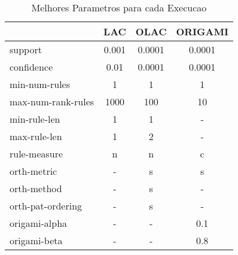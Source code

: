 \begin{table}[htbp]
	\centering
		\begin{tabular}{|l|c|c|c|}
		\hline
					& \textbf{LAC}	& \textbf{OLAC}	& \textbf{ORIGAMI}	\\
		\hline
		support			& 0.001	& 0.0001	& 0.0001		\\
		\hline
		confidence		& 0.01		& 0.0001	& 0.0001		\\
		\hline
		min-num-rules		& 1		& 1		& 1			\\
		\hline
		max-num-rank-rules	& 1000		& 100		& 10			\\
		\hline
		min-rule-len		& 1		& 1		& -			\\
		\hline
		max-rule-len		& 1		& 2		& -			\\
		\hline
		rule-measure		& n		& n		& c			\\
		\hline
		orth-metric		& -		& s		& s			\\
		\hline
		orth-method		& -		& s		& -			\\
		\hline
		orth-pat-ordering	& -		& s		& -			\\
		\hline
		origami-alpha		& -		& -		& 0.1			\\
		\hline
		origami-beta		& -		& -		& 0.8			\\
		\hline
		\end{tabular}
	\caption{Melhores Parametros para cada Execucao}
	\label{tab:best_parms_for_avg_db}
\end{table}